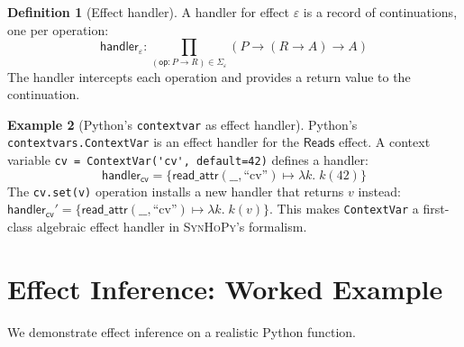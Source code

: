 \documentclass[11pt,a4paper]{report}
\theoremstyle{definition}
\newtheorem{definition}{Definition}[chapter]
\newtheorem{example}[definition]{Example}
\theoremstyle{plain}
\newcommand{\Reads}{\mathsf{Reads}}
\newcommand{\synhopy}{\textsc{SynHoPy}}
\begin{document}
\begin{definition}[Effect handler]
A handler for effect $\varepsilon$ is a record of continuations, one per
operation:
\[
  \mathsf{handler}_\varepsilon : \prod_{(\mathsf{op} : P \to R) \in \Sigma_\varepsilon}
    (P \to (R \to A) \to A)
\]
The handler intercepts each operation and provides a return value to the
continuation.
\end{definition}

\begin{example}[Python's \texttt{contextvar} as effect handler]
Python's \lstinline[style=python]{contextvars.ContextVar} is an effect handler
for the $\Reads$ effect.  A context variable \lstinline[style=python]{cv = ContextVar('cv', default=42)}
defines a handler:
\[
  \mathsf{handler}_{\mathsf{cv}} = \{
    \mathsf{read\_attr}(\_\_, \text{``cv''}) \mapsto \lambda k.\; k(42)
  \}
\]
The \lstinline[style=python]{cv.set(v)} operation installs a new handler that
returns $v$ instead:
$\mathsf{handler}_{\mathsf{cv}}' = \{ \mathsf{read\_attr}(\_\_, \text{``cv''}) \mapsto \lambda k.\; k(v) \}$.
This makes \lstinline[style=python]{ContextVar} a first-class algebraic effect
handler in \synhopy{}'s formalism.
\end{example}


\section{Effect Inference: Worked Example}

We demonstrate effect inference on a realistic Python function.
\end{document}
